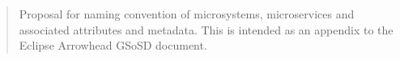 \documentclass[a4paper]{arrowhead}
\begin{document}
\ArrowheadType{}
\ArrowheadDate{\today}
\ArrowheadSetup

\begin{center}
  \vspace*{1cm}
  \huge{\arrowtitle}

  \vspace*{0.2cm}
  \LARGE{\arrowtype}
  \vspace*{1cm}

  \vspace*{\fill}


  \vspace*{1cm}
  \vspace*{\fill}

  \begin{abstract}
    Proposal for naming convention of microsystems, microservices and
    associated attributes and metadata. This is intended as an
    appendix to the Eclipse Arrowhead GSoSD document.  
  \end{abstract}

  \vspace*{1cm}

 \end{center}

\newpage
\end{document}
